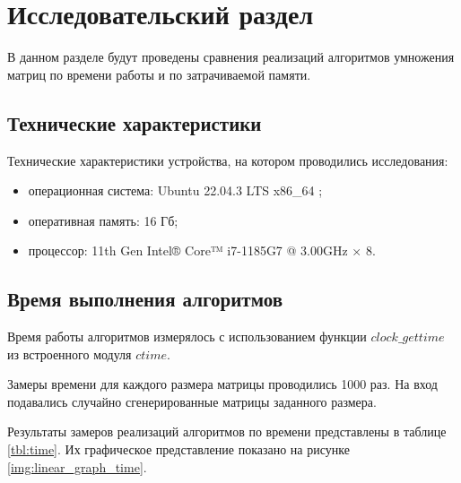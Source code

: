 \chapter{Исследовательский раздел}

В данном разделе будут проведены сравнения реализаций алгоритмов умножения матриц 
по времени работы и по затрачиваемой памяти.

\section{Технические характеристики}

Технические характеристики устройства, на котором проводились исследования: 

\begin{itemize}[label=--]
	\item операционная система: Ubuntu 22.04.3 LTS x86\_64 \cite{os};
	\item оперативная память: 16 Гб;
	\item процессор: 11th Gen Intel® Core™ i7-1185G7 @ 3.00GHz × 8.
\end{itemize}

\section{Время выполнения алгоритмов}

Время работы алгоритмов измерялось с использованием функции $clock\_gettime$ из встроенного модуля $ctime$. 

Замеры времени для каждого размера матрицы проводились 1000 раз. На вход подавались случайно сгенерированные матрицы заданного размера. 

Результаты замеров реализаций алгоритмов по времени представлены в таблице \ref{tbl:time}. Их графическое представление показано на рисунке \ref{img:linear_graph_time}.

